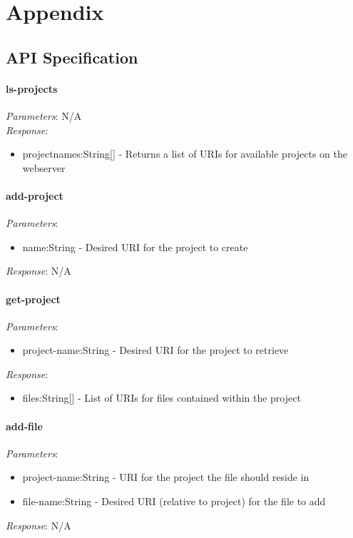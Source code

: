 \documentclass{report}
\begin{document}
\chapter{Appendix}

\section{API Specification}\label{fullApiSpec}

\subsubsection{ls-projects}

\emph{Parameters}: N/A
\\
\emph{Response}: 
\begin{itemize}
\item projectnames:String[] - Returns a list of URIs for available projects on the webserver
\end{itemize} 

\subsubsection{add-project}

\emph{Parameters}: 
\begin{itemize}
\item name:String - Desired URI for the project to create
\end{itemize}
\emph{Response}: N/A

\subsubsection{get-project}
\emph{Parameters}: 
\begin{itemize}
\item project-name:String - Desired URI for the project to retrieve
\end{itemize}
\emph{Response}: 
\begin{itemize}
\item files:String[] - List of URIs for files contained within the project 
\end{itemize}

\subsubsection{add-file}
\emph{Parameters}: 
\begin{itemize}
\item project-name:String - URI for the project the file should reside in
\item file-name:String - Desired URI (relative to project) for the file to add
\end{itemize}
\emph{Response}: N/A
\end{document}
